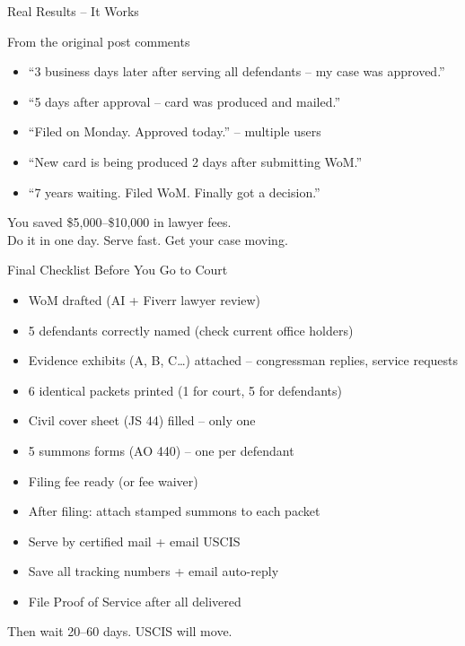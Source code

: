 \documentclass[10pt,aspectratio=169]{beamer}
\begin{document}
	\begin{frame}{Real Results – It Works}
		\begin{block}{From the original post comments}
			\begin{itemize}
				\item “3 business days later after serving all defendants – my case was approved.”
				\item “5 days after approval – card was produced and mailed.”
				\item “Filed on Monday. Approved today.” – multiple users
				\item “New card is being produced 2 days after submitting WoM.”
				\item “7 years waiting. Filed WoM. Finally got a decision.”
			\end{itemize}
		\end{block}
		\centering
		\textcolor{successgreen}{\Large You saved \$5,000–\$10,000 in lawyer fees.}\\
		\tiny Do it in one day. Serve fast. Get your case moving.
	\end{frame}
	
	\begin{frame}{Final Checklist Before You Go to Court}
		\begin{itemize}
			\item [$\square$] WoM drafted (AI + Fiverr lawyer review)
			\item [$\square$] 5 defendants correctly named (check current office holders)
			\item [$\square$] Evidence exhibits (A, B, C…) attached – congressman replies, service requests
			\item [$\square$] 6 identical packets printed (1 for court, 5 for defendants)
			\item [$\square$] Civil cover sheet (JS 44) filled – only one
			\item [$\square$] 5 summons forms (AO 440) – one per defendant
			\item [$\square$] Filing fee ready (or fee waiver)
			\item [$\square$] After filing: attach stamped summons to each packet
			\item [$\square$] Serve by certified mail + email USCIS
			\item [$\square$] Save all tracking numbers + email auto-reply
			\item [$\square$] File Proof of Service after all delivered
		\end{itemize}
		\centering
		\textcolor{titleblue}{Then wait 20–60 days. USCIS will move.}
	\end{frame}
	
\end{document}
